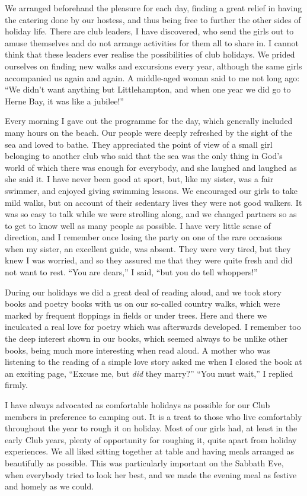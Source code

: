 We arranged beforehand the pleasure for each day,
finding a great relief in having the catering done by our
hostess, and thus being free to further the other sides of
holiday life. There are club leaders, I have discovered,
who send the girls out to amuse themselves and do not
arrange activities for them all to share in. I cannot think
that these leaders ever realise the possibilities of club
holidays. We prided ourselves on finding new walks and
excursions every year, although the same girls accompanied
us again and again. A middle-aged woman said
to me not long ago: “We didn’t want anything but
Littlehampton, and when one year we did go to Herne
Bay, it was like a jubilee!”

Every morning I gave out the programme for the day,
which generally included many hours on the beach. Our
people were deeply refreshed by the sight of the sea and
loved to bathe. They appreciated the point of view of a
small girl belonging to another club who said that the
sea was the only thing in God’s world of which there
was enough for everybody, and she laughed and laughed
as she said it. I have never been good at sport, but, like
my sister, was a fair swimmer, and enjoyed giving swimming
lessons. We encouraged our girls to take mild walks,
but on account of their sedentary lives they were not good
walkers. It was so easy to talk while we were strolling
along, and we changed partners so as to get to know
well as many people as possible. I have very little sense
of direction, and I remember once losing the party on
one of the rare occasions when my sister, an excellent
guide, was absent. They were very tired, but they knew
I was worried, and so they assured me that they were
quite fresh and did not want to rest. “You are dears,”
I said, “but you do tell whoppers!”

During our holidays we did a great deal of reading
aloud, and we took story books and poetry books with
us on our so-called country walks, which were marked by
frequent floppings in fields or under trees. Here and there
we inculcated a real love for poetry which was afterwards
developed. I remember too the deep interest shown in
our books, which seemed always to be unlike other books,
being much more interesting when read aloud. A mother
who was listening to the reading of a simple love story
asked me when I closed the book at an exciting page,
“Excuse me, but \textsl{did} they marry?” “You must wait,”
I replied firmly.

I have always advocated as comfortable holidays as
possible for our Club members in preference to camping
out. It is a treat to those who live comfortably throughout the year to rough it on holiday. Most of our girls had,
at least in the early Club years, plenty of opportunity for
roughing it, quite apart from holiday experiences. We
all liked sitting together at table and having meals
arranged as beautifully as possible. This was particularly
important on the Sabbath Eve, when everybody tried to
look her best, and we made the evening meal as festive
and homely as we could.

